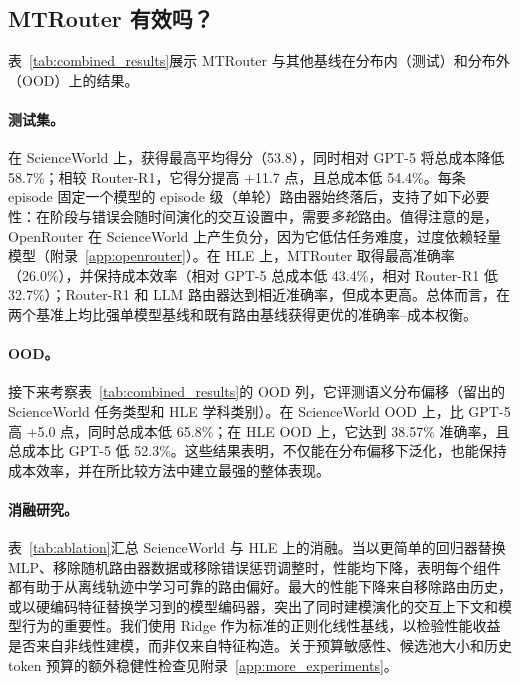\subsection{MTRouter 有效吗？}
\label{sec:main_results}
表~\ref{tab:combined_results}展示 MTRouter 与其他基线在分布内（测试）和分布外（OOD）上的结果。

\paragraph{测试集。}
在 ScienceWorld 上，\method 获得最高平均得分（53.8），同时相对 GPT-5 将总成本降低 58.7\%；相较 Router-R1，它得分提高 +11.7 点，且总成本低 54.4\%。每条 episode 固定一个模型的 episode 级（单轮）路由器始终落后，支持了如下必要性：在阶段与错误会随时间演化的交互设置中，需要\emph{多轮}路由。值得注意的是，OpenRouter 在 ScienceWorld 上产生负分，因为它低估任务难度，过度依赖轻量模型（附录~\ref{app:openrouter}）。在 HLE 上，MTRouter 取得最高准确率（26.0\%），并保持成本效率（相对 GPT-5 总成本低 43.4\%，相对 Router-R1 低 32.7\%）；Router-R1 和 LLM 路由器达到相近准确率，但成本更高。总体而言，\method 在两个基准上均比强单模型基线和既有路由基线获得更优的准确率--成本权衡。



\paragraph{OOD。}
接下来考察表~\ref{tab:combined_results}的 OOD 列，它评测语义分布偏移（留出的 ScienceWorld 任务类型和 HLE 学科类别）。在 ScienceWorld OOD 上，\method 比 GPT-5 高 +5.0 点，同时总成本低 65.8\%；在 HLE OOD 上，它达到 38.57\% 准确率，且总成本比 GPT-5 低 52.3\%。这些结果表明，\method 不仅能在分布偏移下泛化，也能保持成本效率，并在所比较方法中建立最强的整体表现。

\paragraph{消融研究。}
表~\ref{tab:ablation}汇总 ScienceWorld 与 HLE 上的消融。当以更简单的回归器替换 MLP、移除随机路由器数据或移除错误惩罚调整时，性能均下降，表明每个组件都有助于从离线轨迹中学习可靠的路由偏好。最大的性能下降来自移除路由历史，或以硬编码特征替换学习到的模型编码器，突出了同时建模演化的交互上下文和模型行为的重要性。我们使用 Ridge 作为标准的正则化线性基线，以检验性能收益是否来自非线性建模，而非仅来自特征构造。关于预算敏感性、候选池大小和历史 token 预算的额外稳健性检查见附录~\ref{app:more_experiments}。

